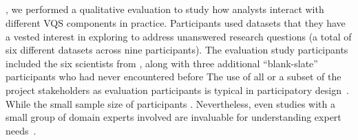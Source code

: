   \subsection{}
  , we performed a qualitative evaluation to study how analysts interact with different VQS components in practice. Participants used datasets that they have a vested interest in exploring to address unanswered research questions (a total of six different datasets across nine participants). The evaluation study participants included the six scientists from , along with three additional ``blank-slate'' participants who had never encountered \zvpp before The use of all or a subset of the project stakeholders as evaluation participants is typical in participatory design~\cite{Bossen2016}. While the small sample size of participants . Nevertheless, even studies with a small group of domain experts involved are invaluable for understanding expert needs~\cite{Sedlmair2012}. %
